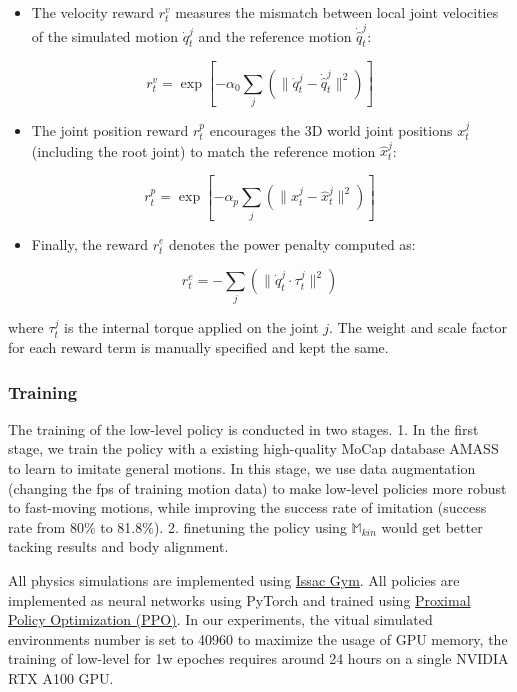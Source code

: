 \documentclass{article}
\begin{document}
\begin{itemize}
\tightlist
\item
  The velocity reward \(r_t^v\) measures the mismatch between local joint velocities of the simulated motion \(\dot{q}_t^{j}\) and the reference motion \(\dot{\hat{q}}_t^{j}\):
\end{itemize}

\[ r_t^v = \exp \left[ -\alpha_0 \sum_j \left( \| \dot{q}_t^{j} - \dot{\hat{q}}_t^{j} \|^2 \right) \right]\]

\begin{itemize}
\tightlist
\item
  The joint position reward \(r_t^p\) encourages the 3D world joint positions \(x_t^{j}\) (including the root joint) to match the reference motion \(\hat{x}_t^{j}\):
\end{itemize}

\[ r_t^p = \exp \left[ -\alpha_p \sum_j \left( \| x_t^{j} - \hat{x}_t^{j} \|^2 \right) \right]\]

\begin{itemize}
\tightlist
\item
  Finally, the reward \(r_t^e\) denotes the power penalty computed as:
\end{itemize}

\[ r_t^e = -\sum_j \left( \| \dot{q}_t^{j} \cdot \tau_t^{j} \|^2 \right)\]

where \(\tau_t^{j}\) is the internal torque applied on the joint \(j\). The weight and scale factor for each reward term is manually specified and kept the same.

\subsubsection{Training}\label{training}

The training of the low-level policy is conducted in two stages. 1. In the first stage, we train the policy with a existing high-quality MoCap database AMASS to learn to imitate general motions. In this stage, we use data augmentation (changing the fps of training motion data) to make low-level policies more robust to fast-moving motions, while improving the success rate of imitation (success rate from 80\% to 81.8\%). 2. finetuning the policy using \(\mathbb{M}_{kin}\) would get better tacking results and body alignment.

All physics simulations are implemented using \href{https://developer.nvidia.com/isaac-gym}{Issac Gym}. All policies are implemented as neural networks using PyTorch and trained using \href{https://arxiv.org/pdf/1707.06347}{Proximal Policy Optimization (PPO)}. In our experiments, the vitual simulated environments number is set to 40960 to maximize the usage of GPU memory, the training of low-level for 1w epoches requires around 24 hours on a single NVIDIA RTX A100 GPU.
\end{document}
